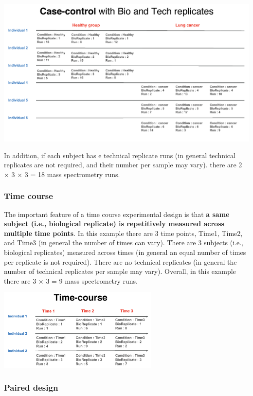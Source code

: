 \documentclass[]{book}
\begin{document}
\includegraphics{img/expdesign_group_tech.png}

In addition, if each subject has e technical replicate runs (in general technical replicates are not required, and their number per sample may vary). there are 2 × 3 × 3 = 18 mass spectrometry runs.

\hypertarget{time-course}{%
\subsubsection{Time course}\label{time-course}}

The important feature of a time course experimental design is that \textbf{a same subject (i.e., biological replicate) is repetitively measured across multiple time points}. In this example there are 3 time points, Time1, Time2, and Time3 (in general the number of times can vary). There are 3 subjects (i.e., biological replicates) measured across times (in general an equal number of times per replicate is not required). There are no technical replicates (in general the number of technical replicates per sample may vary). Overall, in this example there are 3 × 3 = 9 mass spectrometry runs.

\includegraphics[width=0.6\textwidth,height=\textheight]{img/expdesign_time.png}

\hypertarget{paired-design}{%
\subsubsection{Paired design}\label{paired-design}}
\end{document}
